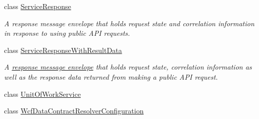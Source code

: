\begin{DoxyCompactItemize}
class \hyperlink{classCqrs_1_1Services_1_1ServiceResponse}{Service\+Response}
\begin{DoxyCompactList}\small\item\em A response message envelope that holds request state and correlation information in response to using public A\+PI requests. \end{DoxyCompactList}\item 
class \hyperlink{classCqrs_1_1Services_1_1ServiceResponseWithResultData}{Service\+Response\+With\+Result\+Data}
\begin{DoxyCompactList}\small\item\em A \hyperlink{interfaceCqrs_1_1Services_1_1IServiceResponse}{response message envelope} that holds request state, correlation information as well as the response data returned from making a public A\+PI request. \end{DoxyCompactList}\item 
class \hyperlink{classCqrs_1_1Services_1_1UnitOfWorkService}{Unit\+Of\+Work\+Service}
\item 
class \hyperlink{classCqrs_1_1Services_1_1WcfDataContractResolverConfiguration}{Wcf\+Data\+Contract\+Resolver\+Configuration}
\end{DoxyCompactItemize}
